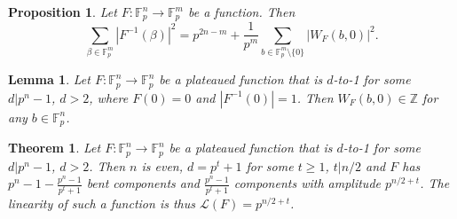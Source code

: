 \documentclass[10pt,a4paper]{amsart}
\newtheorem{proposition}{Proposition}
\newtheorem{lemma}{Lemma}
\newtheorem{theorem}{Theorem}
\newcommand{\F}{\mathbb F}
\newcommand{\Z}{\mathbb Z}
\begin{document}
\begin{proposition} \label{prop:starting}
Let $F \colon \F_{p}^n \rightarrow \F_{p}^m$ be a function. Then 
\[\sum_{\beta \in \F_{p}^m} |F^{-1}(\beta)|^2 = p^{2n-m}+\frac{1}{p^m} \sum_{b \in \F_p^m\setminus\{0\}} |W_F(b,0)|^2.\]
\end{proposition}

\begin{lemma} \label{lem:podd}
    Let $F \colon \F_p^n \rightarrow \F_p^n$ be a plateaued function that is $d$-to-1 for some $d|p^n-1$, $d>2$, where $F(0)=0$ and $|F^{-1}(0)|=1$. Then $W_F(b,0) \in \Z$ for any $b \in \F_p^n$.
\end{lemma}

\begin{theorem} \label{thm:platdto1}
    Let $F \colon \F_p^n \rightarrow \F_p^n$ be a plateaued function that is $d$-to-1 for some $d|p^n-1$, $d>2$. Then $n$ is even, $d=p^t+1$ for some $t \geq 1$, $t|n/2$ and $F$ has $p^n-1-\frac{p^n-1}{p^t+1}$ bent components and $\frac{p^n-1}{p^t+1}$ components with amplitude $p^{n/2+t}$. The linearity of such a function is thus $\mathcal{L}(F)=p^{n/2+t}$.
\end{theorem}
\end{document}
